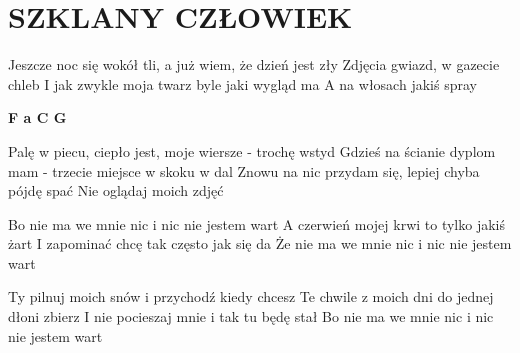 \documentclass[../../../songbook.tex]{subfiles}
\begin{document}
\TabPositions{9cm} %
\section*{SZKLANY CZŁOWIEK}
{}
\vspace{0.5cm}
Jeszcze noc się wokół tli, a już wiem, że dzień jest zły 	 \newline
Zdjęcia gwiazd, w gazecie chleb				 \newline
I jak zwykle moja twarz byle jaki wygląd ma			 \newline
A na włosach jakiś spray			 \newline

{\color{red}\textbf{F a C G} } \newline

Palę w piecu, ciepło jest, moje wiersze - trochę wstyd 	 \newline
Gdzieś na ścianie dyplom mam - trzecie miejsce w skoku w dal			 \newline
Znowu na nic przydam się, lepiej chyba pójdę spać			 \newline
Nie oglądaj moich zdjęć			 \newline

\-\hspace{1cm} Bo nie ma we mnie nic i nic nie jestem wart 		 \newline
\-\hspace{1cm} A czerwień mojej krwi to tylko jakiś żart			 \newline
\-\hspace{1cm} I zapominać chcę tak często jak się da			 \newline
\-\hspace{1cm} Że nie ma we mnie nic i nic nie jestem wart			 \newline

\-\hspace{1cm} Ty pilnuj moich snów i przychodź kiedy chcesz 		 \newline
\-\hspace{1cm} Te chwile z moich dni do jednej dłoni zbierz			 \newline
\-\hspace{1cm} I nie pocieszaj mnie i tak tu będę stał			 \newline
\-\hspace{1cm} Bo nie ma we mnie nic i nic nie jestem wart			 \newline
\end{document}
